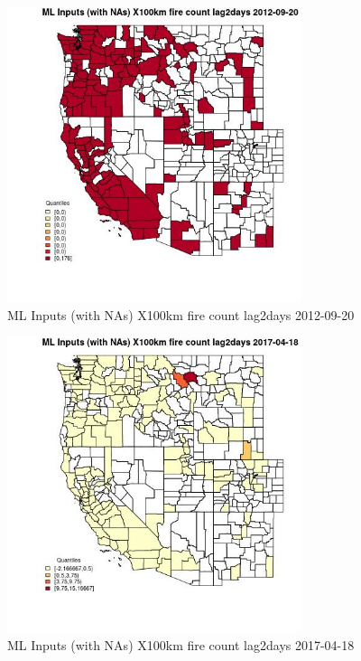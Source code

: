 \begin{figure} 
\centering  
\includegraphics[width=0.77\textwidth]{Code_Outputs/Report_ML_input_PM25_Step4_part_e_de_duplicated_aves_compiled_2019-05-14wNAs_CountyX100km_fire_count_lag2daysMean2012-09-20_2012-09-20.jpg} 
\caption{\label{fig:Report_ML_input_PM25_Step4_part_e_de_duplicated_aves_compiled_2019-05-14wNAsCountyX100km_fire_count_lag2daysMean2012-09-20_2012-09-20}ML Inputs (with NAs) X100km fire count lag2days 2012-09-20} 
\end{figure} 
 

\begin{figure} 
\centering  
\includegraphics[width=0.77\textwidth]{Code_Outputs/Report_ML_input_PM25_Step4_part_e_de_duplicated_aves_compiled_2019-05-14wNAs_CountyX100km_fire_count_lag2daysMean2017-04-18_2017-04-18.jpg} 
\caption{\label{fig:Report_ML_input_PM25_Step4_part_e_de_duplicated_aves_compiled_2019-05-14wNAsCountyX100km_fire_count_lag2daysMean2017-04-18_2017-04-18}ML Inputs (with NAs) X100km fire count lag2days 2017-04-18} 
\end{figure} 
 

